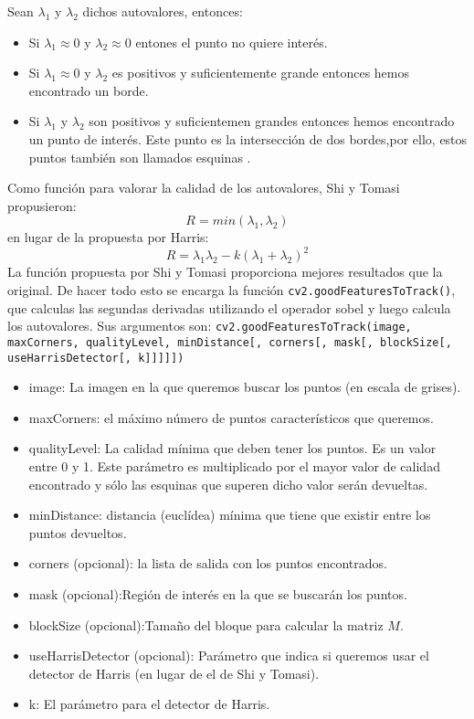 \documentclass[a4paper,openright, 12pt]{book}
\begin{document}
Sean $\lambda_1$ y $\lambda_2$ dichos autovalores, entonces:
\begin{itemize}
\item Si  $ \lambda_1 \approx 0 $ y $\lambda_2 \approx 0 $ entones el punto no quiere interés.
\item Si  $ \lambda_1 \approx 0 $ y $\lambda_2 $ es positivos y suficientemente grande entonces hemos encontrado un borde.
\item Si  $ \lambda_1 $ y $\lambda_2 $ son positivos y suficientemen grandes entonces hemos encontrado un punto de interés. Este punto es la intersección de dos bordes,por ello, estos puntos también son llamados esquinas .
\end{itemize}
Como función para valorar la calidad de los autovalores, Shi y Tomasi propusieron:
\begin{equation*}
R = min(\lambda_1, \lambda_2)
\end{equation*}
en lugar de la propuesta por Harris:
\begin{equation*}
R = \lambda_1 \lambda_2 - k(\lambda_1 + \lambda_2)^2
\end{equation*}
La función propuesta por Shi y Tomasi proporciona mejores resultados que la original.
De hacer todo esto se encarga la función \lstinline|cv2.goodFeaturesToTrack()|, que calculas las segundas derivadas utilizando el operador sobel y luego calcula los autovalores.
Sus argumentos son:
\newline
\lstinline|cv2.goodFeaturesToTrack(image, maxCorners, qualityLevel, minDistance[, corners[, mask[, blockSize[, useHarrisDetector[, k]]]]]) |
\begin{itemize}
\item image: La imagen en la que queremos buscar los puntos (en escala de grises).
\item maxCorners:  el máximo número de puntos característicos que queremos.
\item qualityLevel: La calidad mínima que deben tener los puntos. Es un valor entre 0 y 1. Este parámetro es multiplicado por el mayor valor de calidad encontrado y sólo las esquinas que superen dicho valor serán devueltas.
\item minDistance: distancia (euclídea) mínima que tiene que existir entre los puntos devueltos.
\item corners (opcional): la lista de salida con los puntos encontrados.
\item mask (opcional):Región de interés en la que se buscarán los puntos.
\item blockSize (opcional):Tamaño del bloque para calcular la matriz $M$.
\item useHarrisDetector (opcional): Parámetro que indica si queremos usar el detector de Harris (en lugar de el de Shi y Tomasi).
\item k: El parámetro para el detector de Harris.
\end{itemize}
\end{document}
